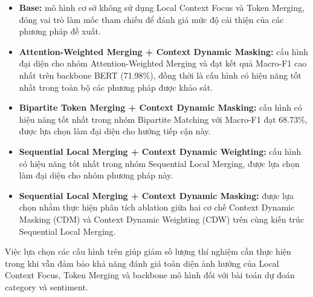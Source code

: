 \begin{itemize}
\item \textbf{Base:} mô hình cơ sở không sử dụng Local Context Focus và Token Merging, đóng vai trò làm mốc tham chiếu để đánh giá mức độ cải thiện của các phương pháp đề xuất.

\item \textbf{Attention-Weighted Merging + Context Dynamic Masking:} cấu hình đại diện cho nhóm Attention-Weighted Merging và đạt kết quả Macro-F1 cao nhất trên backbone BERT (71.98\%), đồng thời là cấu hình có hiệu năng tốt nhất trong toàn bộ các phương pháp được khảo sát.

\item \textbf{Bipartite Token Merging + Context Dynamic Masking:} cấu hình có hiệu năng tốt nhất trong nhóm Bipartite Matching với Macro-F1 đạt 68.73\%, được lựa chọn làm đại diện cho hướng tiếp cận này.

\item \textbf{Sequential Local Merging + Context Dynamic Weighting:} cấu hình có hiệu năng tốt nhất trong nhóm Sequential Local Merging, được lựa chọn làm đại diện cho nhóm phương pháp này.

\item \textbf{Sequential Local Merging + Context Dynamic Masking:} được lựa chọn nhằm thực hiện phân tích ablation giữa hai cơ chế Context Dynamic Masking (CDM) và Context Dynamic Weighting (CDW) trên cùng kiến trúc Sequential Local Merging.
\end{itemize}

Việc lựa chọn các cấu hình trên giúp giảm số lượng thí nghiệm cần thực hiện trong khi vẫn đảm bảo khả năng đánh giá toàn diện ảnh hưởng của Local Context Focus, Token Merging và backbone mô hình đối với bài toán dự đoán category và sentiment.

